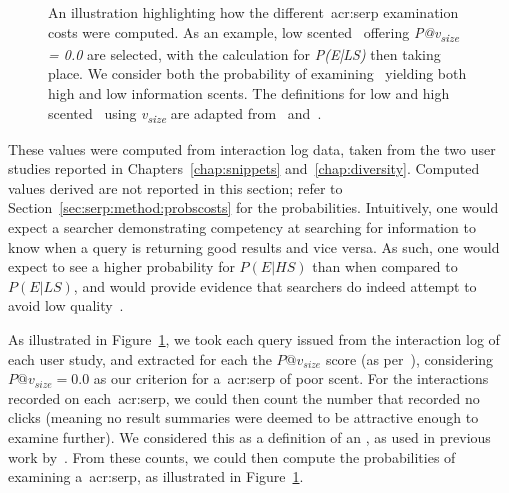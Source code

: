 \begin{figure}[t!]
    \centering
    \caption[Computing~\gls{acr:serp} examination probabilities]{An illustration highlighting how the different~\gls{acr:serp} examination costs were computed. As an example, low scented~ offering \emph{P@v\textsubscript{size} = 0.0} are selected, with the calculation for \emph{P(E|LS)} then taking place. We consider both the probability of examining~ yielding both high and low information scents. The definitions for low and high scented~ using \emph{v\textsubscript{size}} are adapted from~\cite{wu2014information_scent} and~\cite{hassan2013serp_abandonment}.}
    \label{fig:serp_probabilities}
\end{figure}

These values were computed from interaction log data, taken from the two user studies reported in Chapters~\ref{chap:snippets} and~\ref{chap:diversity}. Computed values derived are not reported in this section; refer to Section~\ref{sec:serp:method:probscosts} for the probabilities. Intuitively, one would expect a searcher demonstrating competency at searching for information to know when a query is returning good results and vice versa. As such, one would expect to see a higher probability for $P(E|HS)$ than when compared to $P(E|LS)$, and would provide evidence that searchers do indeed attempt to avoid low quality~.

As illustrated in Figure~\ref{fig:serp_probabilities}, we took each query issued from the interaction log of each user study, and extracted for each the $P@v_{size}$ score (as per~\cite{wu2014information_scent}), considering $P@v_{size}=0.0$ as our criterion for a~\gls{acr:serp} of poor scent. For the interactions recorded on each~\gls{acr:serp}, we could then count the number that recorded no clicks (meaning no result summaries were deemed to be attractive enough to examine further). We considered this as a definition of an , as used in previous work by~\cite{hassan2013serp_abandonment}. From these counts, we could then compute the probabilities of examining a~\gls{acr:serp}, as illustrated in Figure~\ref{fig:serp_probabilities}.


